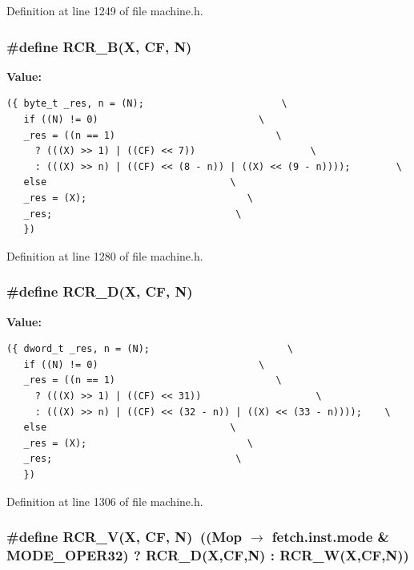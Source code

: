 Definition at line 1249 of file machine.h.
\subsubsection[{RCR\_\-B}]{\setlength{\rightskip}{0pt plus 5cm}\#define RCR\_\-B(X, \/  CF, \/  N)}\label{machine_8h_bd9dcca704afaf19fb7be26124eaa39b}


\textbf{Value:}

\begin{Code}\begin{verbatim}({ byte_t _res, n = (N);                        \
   if ((N) != 0)                            \
   _res = ((n == 1)                            \
     ? (((X) >> 1) | ((CF) << 7))                    \
     : (((X) >> n) | ((CF) << (8 - n)) | ((X) << (9 - n))));        \
   else                                \
   _res = (X);                            \
   _res;                                \
   })
\end{verbatim}
\end{Code}


Definition at line 1280 of file machine.h.
\subsubsection[{RCR\_\-D}]{\setlength{\rightskip}{0pt plus 5cm}\#define RCR\_\-D(X, \/  CF, \/  N)}\label{machine_8h_c2b335eb9776a9ce08c4267429934a0f}


\textbf{Value:}

\begin{Code}\begin{verbatim}({ dword_t _res, n = (N);                        \
   if ((N) != 0)                            \
   _res = ((n == 1)                            \
     ? (((X) >> 1) | ((CF) << 31))                    \
     : (((X) >> n) | ((CF) << (32 - n)) | ((X) << (33 - n))));    \
   else                                \
   _res = (X);                            \
   _res;                                \
   })
\end{verbatim}
\end{Code}


Definition at line 1306 of file machine.h.
\subsubsection[{RCR\_\-V}]{\setlength{\rightskip}{0pt plus 5cm}\#define RCR\_\-V(X, \/  CF, \/  N)~((Mop $\rightarrow$ fetch.inst.mode \& MODE\_\-OPER32) ? RCR\_\-D(X,CF,N) : RCR\_\-W(X,CF,N))}\label{machine_8h_bc2f0329acd58078de0bccece0d2ebba}




